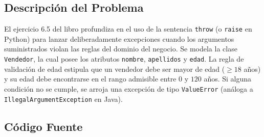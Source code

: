 \documentclass[12pt,letterpaper]{article}
\begin{document}
\subsection{Descripción del Problema}
El ejercicio 6.5 del libro profundiza en el uso de la sentencia \texttt{throw} (o \texttt{raise} en Python) para lanzar deliberadamente excepciones cuando los argumentos suministrados violan las reglas del dominio del negocio. Se modela la clase \texttt{Vendedor}, la cual posee los atributos \texttt{nombre}, \texttt{apellidos} y \texttt{edad}. La regla de validación de edad estipula que un vendedor debe ser mayor de edad ($\ge 18$ años) y su edad debe encontrarse en el rango admisible entre $0$ y $120$ años. Si alguna condición no se cumple, se arroja una excepción de tipo \texttt{ValueError} (análoga a \texttt{IllegalArgumentException} en Java).

\subsection{Código Fuente}
\end{document}
